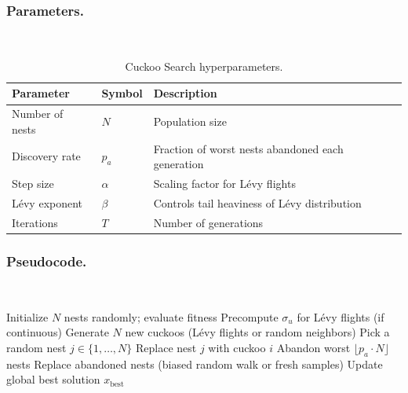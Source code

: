 \subsubsection{Parameters.}~

\begin{table}[H]
\centering
\caption{Cuckoo Search hyperparameters.}
\label{tab:cs-params}
\begin{tabular}{l l p{7cm}}
\hline
\textbf{Parameter} & \textbf{Symbol} & \textbf{Description} \\
\hline
Number of nests     & $N$        & Population size \\
Discovery rate      & $p_a$      & Fraction of worst nests abandoned each generation \\
Step size           & $\alpha$   & Scaling factor for Lévy flights \\
Lévy exponent       & $\beta$    & Controls tail heaviness of Lévy distribution \\
Iterations          & $T$        & Number of generations \\
\hline
\end{tabular}
\end{table}

\subsubsection{Pseudocode.}~

\begin{algorithm}[H]
\caption{Cuckoo Search (Continuous \& Discrete)}
\label{alg:cs}
\begin{algorithmic}[1]
  \State Initialize $N$ nests randomly; evaluate fitness
  \State Precompute $\sigma_u$ for Lévy flights (if continuous)
    \State Generate $N$ new cuckoos (Lévy flights or random neighbors)
      \State Pick a random nest $j \in \{1, \dots, N\}$
        \State Replace nest $j$ with cuckoo $i$
      \EndIf
    \EndFor
    \State Abandon worst $\lfloor p_a \cdot N \rfloor$ nests
    \State Replace abandoned nests (biased random walk or fresh samples)
    \State Update global best solution $x_{\text{best}}$
  \EndFor
\end{algorithmic}
\end{algorithm}

